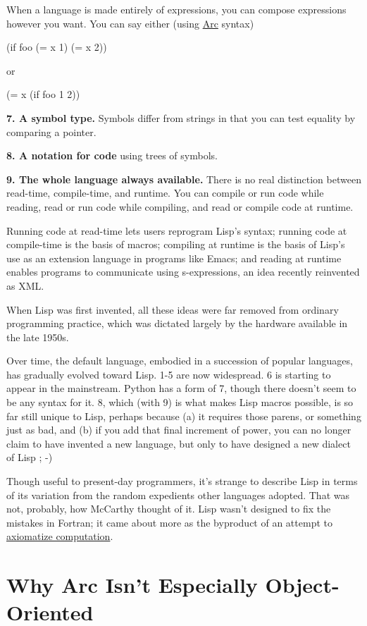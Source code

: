 \documentclass[12pt]{book}
\begin{document}
When a language is made entirely of expressions, you can compose
expressions however you want. You can say either (using
\href{arc.html}{Arc} syntax)

(if foo (= x 1) (= x 2))

or

(= x (if foo 1 2))

\textbf{7. A symbol type.} Symbols differ from strings in that you can
test equality by comparing a pointer.

\textbf{8. A notation for code} using trees of symbols.

\textbf{9. The whole language always available.} There is no real
distinction between read-time, compile-time, and runtime. You can
compile or run code while reading, read or run code while compiling, and
read or compile code at runtime.

Running code at read-time lets users reprogram Lisp's syntax; running
code at compile-time is the basis of macros; compiling at runtime is the
basis of Lisp's use as an extension language in programs like Emacs; and
reading at runtime enables programs to communicate using s-expressions,
an idea recently reinvented as XML.

When Lisp was first invented, all these ideas were far removed from
ordinary programming practice, which was dictated largely by the
hardware available in the late 1950s.

Over time, the default language, embodied in a succession of popular
languages, has gradually evolved toward Lisp. 1-5 are now widespread. 6
is starting to appear in the mainstream. Python has a form of 7, though
there doesn't seem to be any syntax for it. 8, which (with 9) is what
makes Lisp macros possible, is so far still unique to Lisp, perhaps
because (a) it requires those parens, or something just as bad, and (b)
if you add that final increment of power, you can no longer claim to
have invented a new language, but only to have designed a new dialect of
Lisp ; -)

Though useful to present-day programmers, it's strange to describe Lisp
in terms of its variation from the random expedients other languages
adopted. That was not, probably, how McCarthy thought of it. Lisp wasn't
designed to fix the mistakes in Fortran; it came about more as the
byproduct of an attempt to \href{rootsoflisp.html}{axiomatize
computation}.
\chapter{Why Arc Isn't Especially Object-Oriented}
\end{document}
